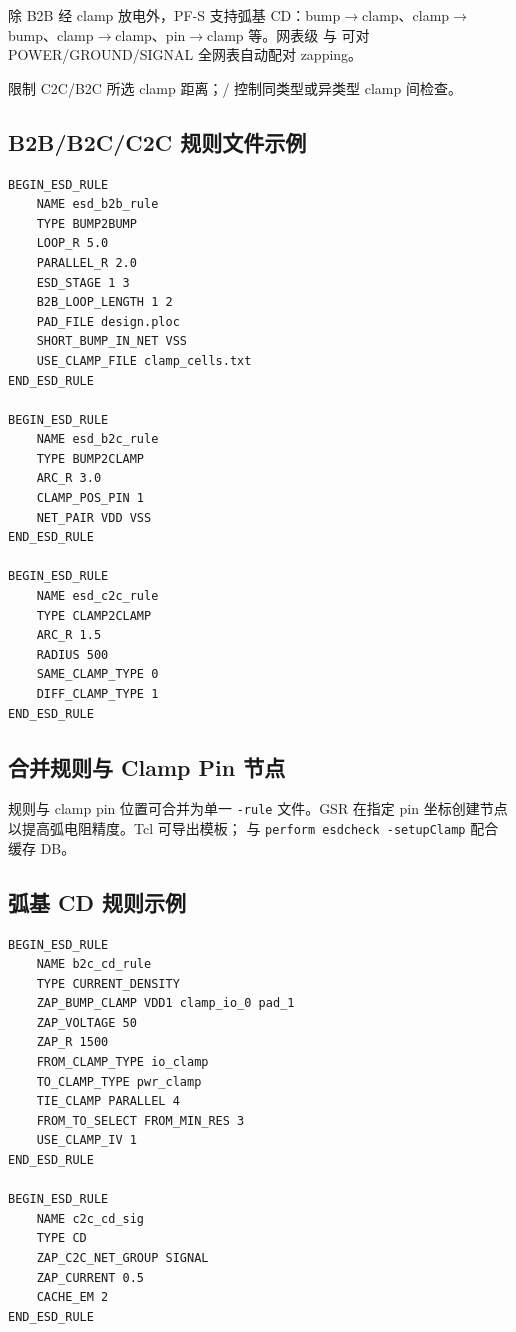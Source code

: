 除 B2B 经 clamp 放电外，PF-S 支持弧基 CD：bump$\rightarrow$clamp、clamp$\rightarrow$bump、clamp$\rightarrow$clamp、pin$\rightarrow$clamp 等。网表级  与  可对 POWER/GROUND/SIGNAL 全网表自动配对 zapping。

 限制 C2C/B2C 所选 clamp 距离；/ 控制同类型或异类型 clamp 间检查。


\subsection{B2B/B2C/C2C 规则文件示例}
\begin{lstlisting}
BEGIN_ESD_RULE
    NAME esd_b2b_rule
    TYPE BUMP2BUMP
    LOOP_R 5.0
    PARALLEL_R 2.0
    ESD_STAGE 1 3
    B2B_LOOP_LENGTH 1 2
    PAD_FILE design.ploc
    SHORT_BUMP_IN_NET VSS
    USE_CLAMP_FILE clamp_cells.txt
END_ESD_RULE

BEGIN_ESD_RULE
    NAME esd_b2c_rule
    TYPE BUMP2CLAMP
    ARC_R 3.0
    CLAMP_POS_PIN 1
    NET_PAIR VDD VSS
END_ESD_RULE

BEGIN_ESD_RULE
    NAME esd_c2c_rule
    TYPE CLAMP2CLAMP
    ARC_R 1.5
    RADIUS 500
    SAME_CLAMP_TYPE 0
    DIFF_CLAMP_TYPE 1
END_ESD_RULE
\end{lstlisting}

\subsection{合并规则与 Clamp Pin 节点}
规则与 clamp pin 位置可合并为单一 \texttt{-rule} 文件。GSR  在指定 pin 坐标创建节点以提高弧电阻精度。Tcl  可导出模板； 与 \texttt{perform esdcheck -setupClamp} 配合缓存 DB。

\subsection{弧基 CD 规则示例}
\begin{lstlisting}
BEGIN_ESD_RULE
    NAME b2c_cd_rule
    TYPE CURRENT_DENSITY
    ZAP_BUMP_CLAMP VDD1 clamp_io_0 pad_1
    ZAP_VOLTAGE 50
    ZAP_R 1500
    FROM_CLAMP_TYPE io_clamp
    TO_CLAMP_TYPE pwr_clamp
    TIE_CLAMP PARALLEL 4
    FROM_TO_SELECT FROM_MIN_RES 3
    USE_CLAMP_IV 1
END_ESD_RULE

BEGIN_ESD_RULE
    NAME c2c_cd_sig
    TYPE CD
    ZAP_C2C_NET_GROUP SIGNAL
    ZAP_CURRENT 0.5
    CACHE_EM 2
END_ESD_RULE
\end{lstlisting}

